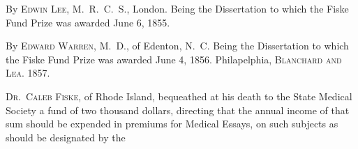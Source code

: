 \footnotesize
{}  By \textsc{Edwin Lee, M.~R.~C.~S.}, London. Being the Dissertation to which the Fiske Fund Prize was awarded June 6, 1855.

  By \textsc{Edward Warren, M.~D.}, of Edenton, N.~C. Being the Dissertation to which the Fiske Fund Prize was awarded June 4, 1856. Philapelphia, \textsc{Blanchard and Lea}. 1857.

\normalsize

\lettrine[lines=1]{}{Dr.~Caleb Fiske}, of Rhode Island, bequeathed at his death to the
State Medical Society a fund of two thousand dollars, directing that
the annual income of that sum should be expended in premiums for
Medical Essays, on such subjects as should be designated by the\endinput
